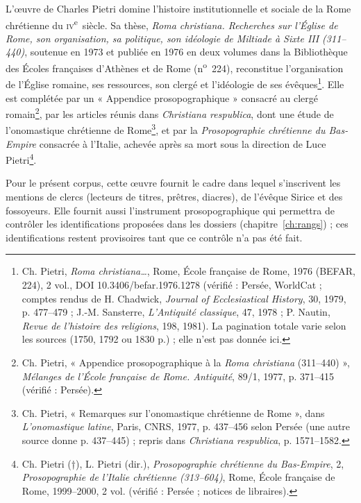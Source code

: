 L’œuvre de Charles Pietri domine l’histoire institutionnelle et sociale de la Rome chrétienne du \textsc{iv}\textsuperscript{e}~siècle. Sa thèse, \emph{Roma christiana. Recherches sur l’Église de Rome, son organisation, sa politique, son idéologie de Miltiade à Sixte III (311–440)}, soutenue en 1973 et publiée en 1976 en deux volumes dans la Bibliothèque des Écoles françaises d’Athènes et de Rome (n\textsuperscript{o}~224), reconstitue l’organisation de l’Église romaine, ses ressources, son clergé et l’idéologie de ses évêques\footnote{Ch. Pietri, \emph{Roma christiana…}, Rome, École française de Rome, 1976 (BEFAR, 224), 2 vol., DOI 10.3406/befar.1976.1278 (vérifié : Persée, WorldCat ; comptes rendus de H. Chadwick, \emph{Journal of Ecclesiastical History}, 30, 1979, p. 477–479 ; J.-M. Sansterre, \emph{L’Antiquité classique}, 47, 1978 ; P. Nautin, \emph{Revue de l’histoire des religions}, 198, 1981). La pagination totale varie selon les sources (1750, 1792 ou 1830 p.) ; elle n’est pas donnée ici.}. Elle est complétée par un « Appendice prosopographique » consacré au clergé romain\footnote{Ch. Pietri, « Appendice prosopographique à la \emph{Roma christiana} (311–440) », \emph{Mélanges de l’École française de Rome. Antiquité}, 89/1, 1977, p. 371–415 (vérifié : Persée).}, par les articles réunis dans \emph{Christiana respublica}, dont une étude de l’onomastique chrétienne de Rome\footnote{Ch. Pietri, « Remarques sur l’onomastique chrétienne de Rome », dans \emph{L’onomastique latine}, Paris, CNRS, 1977, p. 437–456 selon Persée (une autre source donne p. 437–445) ; repris dans \emph{Christiana respublica}, p. 1571–1582.}, et par la \emph{Prosopographie chrétienne du Bas-Empire} consacrée à l’Italie, achevée après sa mort sous la direction de Luce Pietri\footnote{Ch. Pietri (†), L. Pietri (dir.), \emph{Prosopographie chrétienne du Bas-Empire}, 2, \emph{Prosopographie de l’Italie chrétienne (313–604)}, Rome, École française de Rome, 1999–2000, 2 vol. (vérifié : Persée ; notices de libraires).}.

Pour le présent corpus, cette œuvre fournit le cadre dans lequel s’inscrivent les mentions de clercs (lecteurs de titres, prêtres, diacres), de l’évêque Sirice et des fossoyeurs. Elle fournit aussi l’instrument prosopographique qui permettra de contrôler les identifications proposées dans les dossiers (chapitre~\ref{ch:rangs}) ; ces identifications restent provisoires tant que ce contrôle n’a pas été fait.

